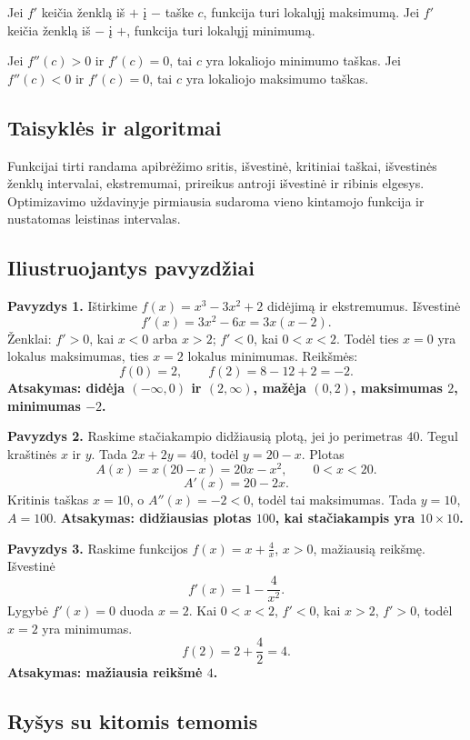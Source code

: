 \begin{savybe}
Jei $f'$ keičia ženklą iš $+$ į $-$ taške $c$, funkcija turi lokalųjį maksimumą. Jei $f'$ keičia ženklą iš $-$ į $+$, funkcija turi lokalųjį minimumą.
\end{savybe}

\begin{savybe}
Jei $f''(c)>0$ ir $f'(c)=0$, tai $c$ yra lokaliojo minimumo taškas. Jei $f''(c)<0$ ir $f'(c)=0$, tai $c$ yra lokaliojo maksimumo taškas.
\end{savybe}

\subsection{Taisyklės ir algoritmai}

Funkcijai tirti randama apibrėžimo sritis, išvestinė, kritiniai taškai, išvestinės ženklų intervalai, ekstremumai, prireikus antroji išvestinė ir ribinis elgesys. Optimizavimo uždavinyje pirmiausia sudaroma vieno kintamojo funkcija ir nustatomas leistinas intervalas.

\subsection{Iliustruojantys pavyzdžiai}

\textbf{Pavyzdys 1.} Ištirkime $f(x)=x^3-3x^2+2$ didėjimą ir ekstremumus. Išvestinė
\[
f'(x)=3x^2-6x=3x(x-2).
\]
Ženklai: $f'>0$, kai $x<0$ arba $x>2$; $f'<0$, kai $0<x<2$. Todėl ties $x=0$ yra lokalus maksimumas, ties $x=2$ lokalus minimumas. Reikšmės:
\[
f(0)=2,\qquad f(2)=8-12+2=-2.
\]
\textbf{Atsakymas: didėja $(-\infty,0)$ ir $(2,\infty)$, mažėja $(0,2)$, maksimumas $2$, minimumas $-2$.}

\textbf{Pavyzdys 2.} Raskime stačiakampio didžiausią plotą, jei jo perimetras $40$. Tegul kraštinės $x$ ir $y$. Tada $2x+2y=40$, todėl $y=20-x$. Plotas
\[
A(x)=x(20-x)=20x-x^2,\qquad 0<x<20.
\]
\[
A'(x)=20-2x.
\]
Kritinis taškas $x=10$, o $A''(x)=-2<0$, todėl tai maksimumas. Tada $y=10$, $A=100$. \textbf{Atsakymas: didžiausias plotas $100$, kai stačiakampis yra $10\times10$.}

\textbf{Pavyzdys 3.} Raskime funkcijos $f(x)=x+\frac4x$, $x>0$, mažiausią reikšmę. Išvestinė
\[
f'(x)=1-\frac4{x^2}.
\]
Lygybė $f'(x)=0$ duoda $x=2$. Kai $0<x<2$, $f'<0$, kai $x>2$, $f'>0$, todėl $x=2$ yra minimumas. 
\[
f(2)=2+\frac42=4.
\]
\textbf{Atsakymas: mažiausia reikšmė $4$.}

\subsection{Ryšys su kitomis temomis}

